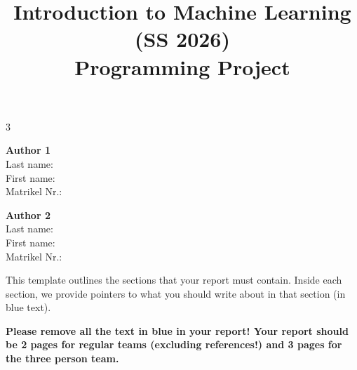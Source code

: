 \documentclass[a4, 10 pt, conference]{ieeeconf}  %
\title{\LARGE \bf
Introduction to Machine Learning (SS 2026)\\ Programming Project
\vspace{-3em}
}
\begin{document}
\maketitle
\vspace{-3em}
\thispagestyle{empty}
\pagestyle{empty}

\begin{strip}
\begin{tcolorbox}[
size=tight,
colback=white,
boxrule=0.2mm,
left=3mm,right=3mm, top=3mm, bottom=1mm
]
{\begin{multicols}{3}%

\textbf{Author 1}       \\
Last name:              \\  %
First name:             \\  %
Matrikel Nr.:               \\  %

\columnbreak

\textbf{Author 2}       \\
Last name:              \\  %
First name:             \\  %
Matrikel Nr.:               \\  %

\columnbreak


\end{multicols}}
\end{tcolorbox}
\end{strip}



{\color{blue}
  \noindent This template outlines the sections that your report must 
  contain. Inside each section, we provide pointers to what you should
  write about in that section (in blue text).  \linebreak

\noindent \textbf{Please remove all the text in blue in your report!
  Your report should be 2 pages for regular teams (excluding references!)
  and 3 pages for the three person team.}  }
\end{document}
